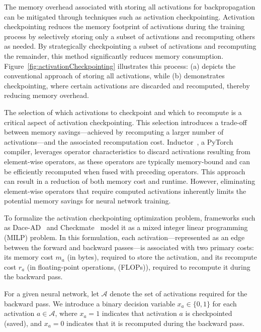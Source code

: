 \documentclass[lettersize,journal]{IEEEtran}
\begin{document}
The memory overhead associated with storing all activations for backpropagation can be mitigated through techniques such as activation checkpointing.
Activation checkpointing reduces the memory footprint of activations during the training process by selectively storing only a subset of activations and recomputing others as needed.
By strategically checkpointing a subset of activations and recomputing the remainder, this method significantly reduces memory consumption.
Figure~\ref{fig:activationCheckpointing} illustrates this process: (a) depicts the conventional approach of storing all activations, while (b) demonstrates checkpointing, where certain activations are discarded and recomputed, thereby reducing memory overhead.

The selection of which activations to checkpoint and which to recompute is a critical aspect of activation checkpointing.
This selection introduces a trade-off between memory savings—achieved by recomputing a larger number of activations—and the associated recomputation cost.
Inductor~\cite{pytorch_activation_checkpointing_2025}, a PyTorch compiler, leverages operator characteristics to discard activations resulting from element-wise operators, as these operators are typically memory-bound and can be efficiently recomputed when fused with preceding operators.
This approach can result in a reduction of both memory cost and runtime.
However, eliminating element-wise operators that require computed activations inherently limits the potential memory savings for neural network training.

To formalize the activation checkpointing optimization problem, frameworks such as Dace-AD~\cite{boudaoud2025dace} and Checkmate~\cite{jain2020checkmate} model it as a mixed integer linear programming (MILP) problem.
In this formulation, each activation—represented as an edge between the forward and backward passes—is associated with two primary costs:
its memory cost \( m_a \) (in bytes), required to store the activation, and its recompute cost \( r_a \) (in floating-point operations, (FLOPs)), required to recompute it during the backward pass.

For a given neural network, let \(\mathcal{A}\) denote the set of activations required for the backward pass.
We introduce a binary decision variable \( x_a \in \{0, 1\} \) for each activation \( a \in \mathcal{A} \), where \( x_a = 1 \) indicates that activation \( a \) is checkpointed (saved), and \( x_a = 0 \) indicates that it is recomputed during the backward pass.
\end{document}
